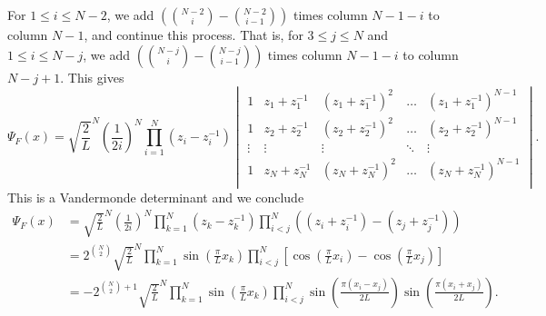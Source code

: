 \documentclass[a4paper,11pt]{article}
\numberwithin{equation}{section}
\begin{document}
	For $1\leq i\leq N-2 $, we add $ \left(\binom{N-2}{i}-\binom{N-2}{i-1}\right) $ times column $ N-1-i $ to column $ N-1 $, and continue this process. That is, for $3\leq j\leq N$ and $1\leq i\leq N-j $, we add  $ \left(\binom{N-j}{i}-\binom{N-j}{i-1}\right) $ times column $ N-1-i $ to column $ N-j+1 $. This gives \begin{equation}
	\Psi_F(x)=\sqrt{\frac{2}{L}}^N\left(\frac{1}{2i}\right)^N\prod_{i=1}^{N}(z_i-z_i^{-1})\begin{vmatrix}
	1&z_1+z_1^{-1}&(z_1+z_1^{-1})^2&\ldots&(z_1+z_1^{-1})^{N-1}\\
	1&z_2+z_2^{-1}&(z_2+z_2^{-1})^2&\ldots&(z_2+z_2^{-1})^{N-1}\\
	\vdots&\vdots&\vdots&\ddots&\vdots\\
	1&z_N+z_N^{-1}&(z_N+z_N^{-1})^2&\ldots&(z_N+z_N^{-1})^{N-1}\\
	\end{vmatrix}.
	\end{equation}
	This is a Vandermonde determinant and we conclude \begin{equation}
	\begin{aligned}
	\Psi_F(x)&=\sqrt{\frac{2}{L}}^N\left(\frac{1}{2i}\right)^N\prod_{k=1}^{N}(z_k-z_k^{-1})\prod_{i<j}^{N}\left((z_i+z_i^{-1})-(z_j+z_j^{-1})\right)\\
	&=2^{\binom{N}{2}}\sqrt{\frac{2}{L}}^N\prod_{k=1}^{N}\sin\left(\frac{\pi}{L}x_k\right)\prod_{i<j}^{N}\left[\cos\left(\frac{\pi}{L}x_i\right)-\cos\left(\frac{\pi}{L}x_j\right)\right]\\
	&=-2^{\binom{N}{2}+1}\sqrt{\frac{2}{L}}^N\prod_{k=1}^{N}\sin\left(\frac{\pi}{L}x_k\right)\prod_{i<j}^{N}\sin\left(\frac{\pi(x_i-x_j)}{2L}\right)\sin\left(\frac{\pi(x_i+x_j)}{2L}\right)
	.
	\end{aligned}
	\end{equation}
	
\end{document}
